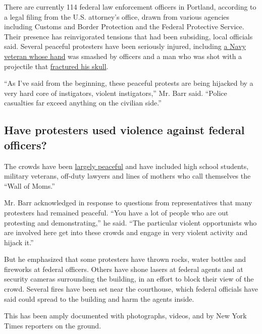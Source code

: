 There are currently 114 federal law enforcement officers in Portland,
according to a legal filing from the U.S. attorney's office, drawn from
various agencies including Customs and Border Protection and the Federal
Protective Service. Their presence has reinvigorated tensions that had
been subsiding, local officials said. Several peaceful protesters have
been seriously injured, including
\href{https://www.nytimes.com/2020/07/20/us/portland-protests-navy-christopher-david.html}{a
Navy veteran whose hand} was smashed by officers and a man who was shot
with a projectile that
\href{https://www.oregonlive.com/news/2020/07/police-shoot-portland-protester-in-head-with-impact-weapon-causing-severe-injuries.html}{fractured
his skull}.

``As I've said from the beginning, these peaceful protests are being
hijacked by a very hard core of instigators, violent instigators,'' Mr.
Barr said. ``Police casualties far exceed anything on the civilian
side.''

\hypertarget{have-protesters-used-violence-against-federal-officers}{%
\subsection{Have protesters used violence against federal
officers?}\label{have-protesters-used-violence-against-federal-officers}}

The crowds have been
\href{https://www.nytimes.com/2020/07/27/us/protests-divisions-blm.html}{largely
peaceful} and have included high school students, military veterans,
off-duty lawyers and lines of mothers who call themselves the ``Wall of
Moms.''

Mr. Barr acknowledged in response to questions from representatives that
many protesters had remained peaceful. ``You have a lot of people who
are out protesting and demonstrating,'' he said. ``The particular
violent opportunists who are involved here get into these crowds and
engage in very violent activity and hijack it.''

But he emphasized that some protesters have thrown rocks, water bottles
and fireworks at federal officers. Others have shone lasers at federal
agents and at security cameras surrounding the building, in an effort to
block their view of the crowd. Several fires have been set near the
courthouse, which federal officials have said could spread to the
building and harm the agents inside.

This has been amply documented with photographs, videos, and by New York
Times reporters on the ground.


